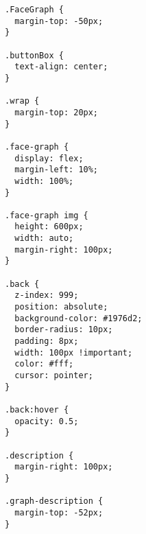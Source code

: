 \begin{verbatim}
.FaceGraph {
  margin-top: -50px;
}

.buttonBox {
  text-align: center;
}

.wrap {
  margin-top: 20px;
}

.face-graph {
  display: flex;
  margin-left: 10%;
  width: 100%;
}

.face-graph img {
  height: 600px;
  width: auto;
  margin-right: 100px;
}

.back {
  z-index: 999;
  position: absolute;
  background-color: #1976d2;
  border-radius: 10px;
  padding: 8px;
  width: 100px !important;
  color: #fff;
  cursor: pointer;
}

.back:hover {
  opacity: 0.5;
}

.description {
  margin-right: 100px;
}

.graph-description {
  margin-top: -52px;
}

\end{verbatim}